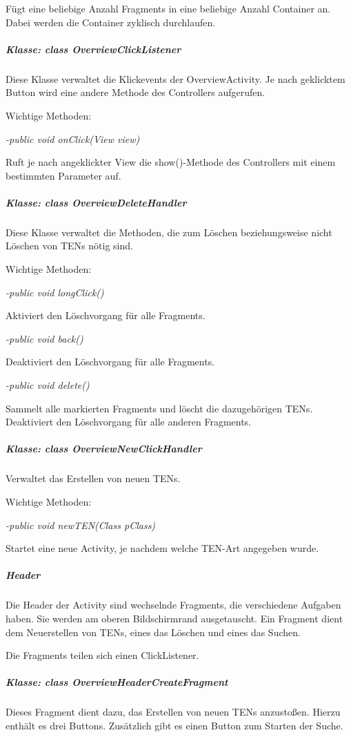 Fügt eine beliebige Anzahl Fragments in eine beliebige Anzahl Container an. Dabei werden die Container zyklisch durchlaufen.

\subparagraph*{Klasse: class OverviewClickListener}

Diese Klasse verwaltet die Klickevents der OverviewActivity. Je nach geklicktem Button wird eine andere Methode des Controllers aufgerufen.

Wichtige Methoden:

\textit{-public void onClick(View view)}

Ruft je nach angeklickter View die show()-Methode des Controllers mit einem bestimmten Parameter auf.

\subparagraph*{Klasse: class OverviewDeleteHandler}

Diese Klasse verwaltet die Methoden, die zum Löschen beziehungsweise nicht Löschen von TENs nötig sind.

Wichtige Methoden:

\textit{-public void longClick()}

Aktiviert den Löschvorgang für alle Fragments.

\textit{-public void back()}

Deaktiviert den Löschvorgang für alle Fragments.

\textit{-public void delete()}

Sammelt alle markierten Fragments und löscht die dazugehörigen TENs. Deaktiviert den Löschvorgang für alle anderen Fragments.

\subparagraph*{Klasse: class OverviewNewClickHandler}

Verwaltet das Erstellen von neuen TENs.

Wichtige Methoden:

\textit{-public void newTEN(Class pClass)}

Startet eine neue Activity, je nachdem welche TEN-Art angegeben wurde.

\subparagraph{Header}

Die Header der Activity sind wechselnde Fragments, die verschiedene Aufgaben haben. Sie werden am oberen Bildschirmrand ausgetauscht. Ein Fragment dient dem Neuerstellen von TENs, eines das Löschen und eines das Suchen.

Die Fragments teilen sich einen ClickListener.

\subparagraph*{Klasse: class OverviewHeaderCreateFragment}

Dieses Fragment dient dazu, das Erstellen von neuen TENs anzustoßen. Hierzu enthält es drei Buttons. Zusätzlich gibt es einen Button zum Starten der Suche.

